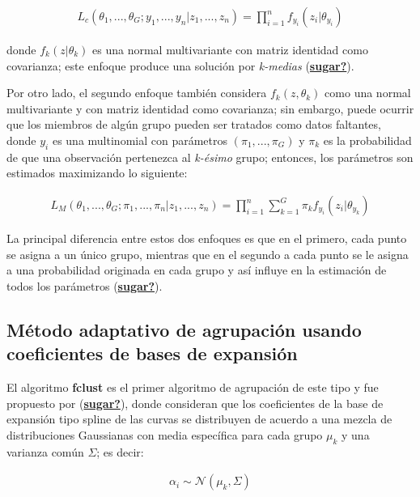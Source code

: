 \documentclass[
]{book}
\begin{document}
\begin{align*}
    L_c(\theta_1,...,\theta_G;y_1,...,y_n|z_1,...,z_n)=\prod_{i=1}^n {f_{y_i}(z_i|\theta_{y_i})}
\end{align*}

donde \(f_{k}(z|\theta_k)\) es una normal multivariante con matriz identidad como covarianza; este enfoque produce una solución por \emph{k-medias} (\protect\hyperlink{ref-sugar}{\textbf{sugar?}}).

Por otro lado, el segundo enfoque también considera \(f_k(z,\theta_k)\) como una normal multivariante y con matriz identidad como covarianza; sin embargo, puede ocurrir que los miembros de algún grupo pueden ser tratados como datos faltantes, donde \(y_i\) es una multinomial con parámetros \((\pi_1,...,\pi_G)\) y \(\pi_k\) es la probabilidad de que una observación pertenezca al \emph{k-ésimo} grupo; entonces, los parámetros son estimados maximizando lo siguiente:

\begin{align*}
    L_M(\theta_1,...,\theta_G;\pi_1,...,\pi_n|z_1,...,z_n)=\prod_{i=1}^n \sum_{k=1}^G\pi_k f_{y_i}(z_i|\theta_{y_k})
\end{align*}

La principal diferencia entre estos dos enfoques es que en el primero, cada punto se asigna a un único grupo, mientras que en el segundo a cada punto se le asigna a una probabilidad originada en cada grupo y así influye en la estimación de todos los parámetros (\protect\hyperlink{ref-sugar}{\textbf{sugar?}}).

\hypertarget{muxe9todo-adaptativo-de-agrupaciuxf3n-usando-coeficientes-de-bases-de-expansiuxf3n}{%
\subsection{Método adaptativo de agrupación usando coeficientes de bases de expansión}\label{muxe9todo-adaptativo-de-agrupaciuxf3n-usando-coeficientes-de-bases-de-expansiuxf3n}}

El algoritmo \textbf{fclust} es el primer algoritmo de agrupación de este tipo y fue propuesto por (\protect\hyperlink{ref-sugar}{\textbf{sugar?}}), donde consideran que los coeficientes de la base de expansión tipo spline de las curvas se distribuyen de acuerdo a una mezcla de distribuciones Gaussianas con media específica para cada grupo \(\mu_k\) y una varianza común \(\Sigma\); es decir:

\begin{align*}
    \alpha_i \sim \mathcal{N}(\mu_k,\Sigma)
\end{align*}
\end{document}
